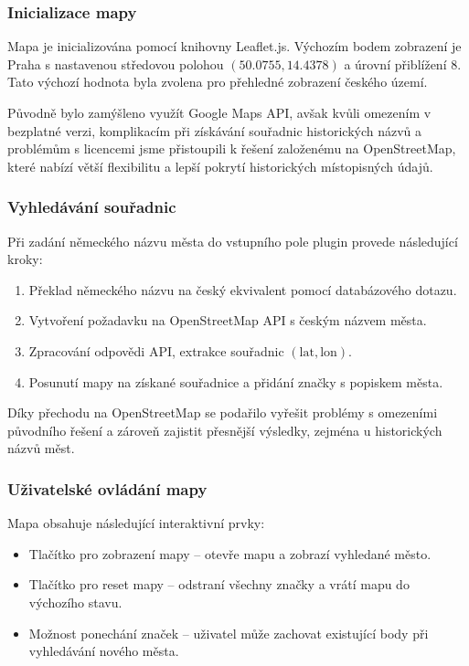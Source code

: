 \documentclass[czech, ba, kiv, he]{fasthesis}
\begin{document}
\subsubsection{Inicializace mapy}

Mapa je inicializována pomocí knihovny Leaflet.js. Výchozím bodem zobrazení je Praha s nastavenou středovou polohou $(50.0755, 14.4378)$ a úrovní přiblížení 8. Tato výchozí hodnota byla zvolena pro přehledné zobrazení českého území.

Původně bylo zamýšleno využít Google Maps API, avšak kvůli omezením v bezplatné verzi, komplikacím při získávání souřadnic historických názvů a problémům s licencemi jsme přistoupili k řešení založenému na OpenStreetMap, které nabízí větší flexibilitu a lepší pokrytí historických místopisných údajů.

\subsubsection{Vyhledávání souřadnic}

Při zadání německého názvu města do vstupního pole plugin provede následující kroky:

\begin{enumerate}
\item Překlad německého názvu na český ekvivalent pomocí databázového dotazu.
\item Vytvoření požadavku na OpenStreetMap API s českým názvem města.
\item Zpracování odpovědi API, extrakce souřadnic $(\text{lat}, \text{lon})$.
\item Posunutí mapy na získané souřadnice a přidání značky s popiskem města.
\end{enumerate}

Díky přechodu na OpenStreetMap se podařilo vyřešit problémy s omezeními původního řešení a zároveň zajistit přesnější výsledky, zejména u historických názvů měst.

\subsubsection{Uživatelské ovládání mapy}

Mapa obsahuje následující interaktivní prvky:

\begin{itemize}
\item Tlačítko pro zobrazení mapy – otevře mapu a zobrazí vyhledané město.
\item Tlačítko pro reset mapy – odstraní všechny značky a vrátí mapu do výchozího stavu.
\item Možnost ponechání značek – uživatel může zachovat existující body při vyhledávání nového města.
\end{itemize}
\end{document}
